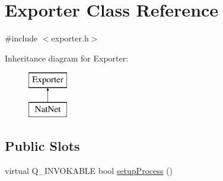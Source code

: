 \hypertarget{class_exporter}{\section{\-Exporter \-Class \-Reference}
\label{class_exporter}
}


{\ttfamily \#include $<$exporter.\-h$>$}

\-Inheritance diagram for \-Exporter\-:\begin{figure}[H]
\begin{center}
\leavevmode
\includegraphics[height=2.000000cm]{class_exporter}
\end{center}
\end{figure}
\subsection*{\-Public \-Slots}
\begin{DoxyCompactItemize}
\item 
virtual \-Q\-\_\-\-I\-N\-V\-O\-K\-A\-B\-L\-E bool \hyperlink{group___mo_cap_plugin_gad43c05ef37398dad0c09a5103beb27d8}{setup\-Process} ()
\end{DoxyCompactItemize}
